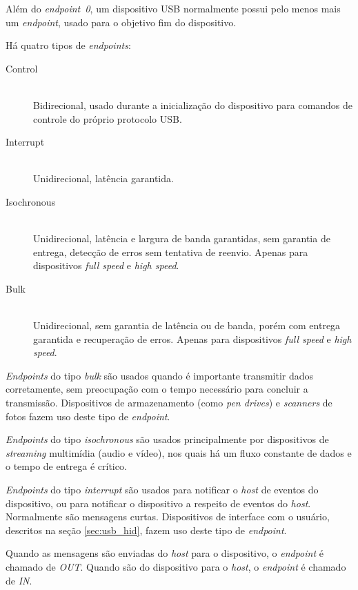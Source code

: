 \documentclass[brazil,pagestart=firstchapter]{abnt}
\begin{document}
Além do \textit{endpoint~0}, um dispositivo \ac{USB} normalmente possui pelo
menos mais um \textit{endpoint}, usado para o objetivo fim do dispositivo.

Há quatro tipos de \textit{endpoints}: \cite[cap.~4]{usbinanutshell}

\begin{description}
\item[Control] \hfill \\
	Bidirecional, usado durante a inicialização do dispositivo para comandos
	de controle do próprio protocolo \ac{USB}.
\item[Interrupt]  \hfill \\
	Unidirecional, latência garantida.
\item[Isochronous] \hfill \\
	Unidirecional, latência e largura de banda garantidas, sem garantia de
	entrega, detecção de erros sem tentativa de reenvio. Apenas para
	dispositivos \textit{full speed} e \textit{high speed}.
\item[Bulk] \hfill \\
	Unidirecional, sem garantia de latência ou de banda, porém com entrega
	garantida e recuperação de erros. Apenas para dispositivos \textit{full
	speed} e \textit{high speed}.
\end{description}

\textit{Endpoints} do tipo \textit{bulk} são usados quando é importante
transmitir dados corretamente, sem preocupação com o tempo necessário para
concluir a transmissão. Dispositivos de armazenamento (como \textit{pen
drives}) e \textit{scanners} de fotos fazem uso deste tipo de
\textit{endpoint}.

\textit{Endpoints} do tipo \textit{isochronous} são usados principalmente
por dispositivos de \textit{streaming} multimídia (audio e vídeo), nos quais
há um fluxo constante de dados e o tempo de entrega é crítico.

\textit{Endpoints} do tipo \textit{interrupt} são usados para notificar o
\textit{host} de eventos do dispositivo, ou para notificar o dispositivo a
respeito de eventos do \textit{host}. Normalmente são mensagens curtas.
Dispositivos de interface com o usuário, descritos na seção
\ref{sec:usb_hid}, fazem uso deste tipo de \textit{endpoint}.

Quando as mensagens são enviadas do \textit{host} para o dispositivo, o
\textit{endpoint} é chamado de \textit{OUT}. Quando são do dispositivo para
o \textit{host}, o \textit{endpoint} é chamado de \textit{IN}.
\end{document}
